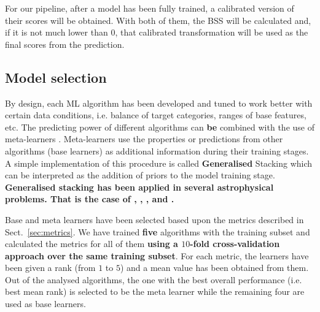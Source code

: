\documentclass{aa}
\begin{document}
For our pipeline, after a model has been fully trained, a calibrated version of their scores will be obtained. With both of them, the BSS will be calculated and, if it is not much lower than $0$, that calibrated transformation will be used as the final scores from the prediction.

\subsection{Model selection}\label{sec:model_selection}

By design, each ML algorithm has been developed and tuned to work better with certain data conditions, i.e. balance of target categories, ranges of base features, etc. 
The predicting power of different algorithms can \textbf{be} combined with the use of meta-learners \citep{Vanschoren2019}. Meta-learners use the properties or predictions from other algorithms (base learners) as additional information during their training stages. A simple implementation of this procedure is called \textbf{Generalised} Stacking \citep{WOLPERT1992241} which can be interpreted
as the addition of priors to the model training stage. \textbf{Generalised stacking has been applied in several astrophysical problems. That is the case of \citet{2016MNRAS.460.3152Z}, \citet{2022arXiv220913074H}, \citet{2022A&A...666A..87C}, and \citet{2022arXiv220614944E}.}

Base and meta learners have been selected based upon the metrics described in Sect.~\ref{sec:metrics}. We have trained \textbf{five} algorithms with the training subset and calculated the metrics for all of them \textbf{using a $10$-fold cross-validation approach \citep[e.g.][]{https://doi.org/10.1111/j.2517-6161.1974.tb00994.x, doi:10.1080/00401706.1974.10489157} over the same training subset}. For each metric, the learners have been given a rank (from $1$ to $5$) and a mean value has been obtained from them. Out of the analysed algorithms, the one with the best overall performance (i.e. best mean rank) is selected to be the meta learner while the remaining four are used as base learners.
\end{document}
